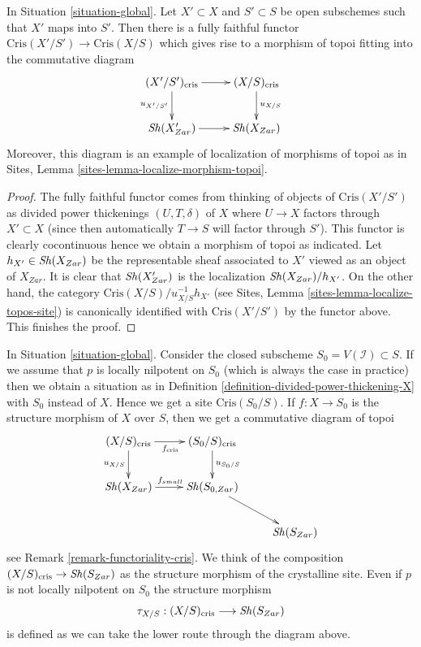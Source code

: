 \begin{lemma}
\label{lemma-localize}
In Situation \ref{situation-global}.
Let $X' \subset X$ and $S' \subset S$ be open subschemes such that
$X'$ maps into $S'$. Then there is a fully faithful functor
$\text{Cris}(X'/S') \to \text{Cris}(X/S)$
which gives rise to a morphism of topoi fitting into the commutative
diagram
$$
\xymatrix{
(X'/S')_{\text{cris}} \ar[r] \ar[d]_{u_{X'/S'}} &
(X/S)_{\text{cris}} \ar[d]^{u_{X/S}} \\
\Sh(X'_{Zar}) \ar[r] & \Sh(X_{Zar})
}
$$
Moreover, this diagram is an example of localization of morphisms of
topoi as in Sites, Lemma \ref{sites-lemma-localize-morphism-topoi}.
\end{lemma}

\begin{proof}
The fully faithful functor comes from thinking of
objects of $\text{Cris}(X'/S')$ as divided power
thickenings $(U, T, \delta)$ of $X$ where $U \to X$
factors through $X' \subset X$ (since then automatically $T \to S$
will factor through $S'$). This functor is clearly cocontinuous
hence we obtain a morphism of topoi as indicated.
Let $h_{X'} \in \mathop{\mathit{Sh}}\nolimits(X_{Zar})$ be the representable sheaf associated
to $X'$ viewed as an object of $X_{Zar}$. It is clear that
$\mathop{\mathit{Sh}}\nolimits(X'_{Zar})$ is the localization $\mathop{\mathit{Sh}}\nolimits(X_{Zar})/h_{X'}$.
On the other hand, the category $\text{Cris}(X/S)/u_{X/S}^{-1}h_{X'}$
(see Sites, Lemma \ref{sites-lemma-localize-topos-site})
is canonically identified with $\text{Cris}(X'/S')$ by the functor above.
This finishes the proof.
\end{proof}

\begin{remark}
\label{remark-structure-morphism}
In Situation \ref{situation-global}.
Consider the closed subscheme $S_0 = V(\mathcal{I}) \subset S$.
If we assume that $p$ is locally nilpotent on $S_0$ (which is always
the case in practice) then we obtain a situation as in
Definition \ref{definition-divided-power-thickening-X} with $S_0$ instead
of $X$. Hence we get a site $\text{Cris}(S_0/S)$. If $f : X \to S_0$
is the structure morphism of $X$ over $S$, then we get a
commutative diagram of topoi
$$
\xymatrix{
(X/S)_{\text{cris}}
\ar[r]_{f_{\text{cris}}} \ar[d]_{u_{X/S}} &
(S_0/S)_{\text{cris}} \ar[d]^{u_{S_0/S}} \\
\Sh(X_{Zar}) \ar[r]^{f_{small}} & \Sh(S_{0, Zar}) \ar[rd] \\
& & \Sh(S_{Zar})
}
$$
see Remark \ref{remark-functoriality-cris}. We think of the composition
$(X/S)_{\text{cris}} \to \mathop{\mathit{Sh}}\nolimits(S_{Zar})$ as the structure morphism of the
crystalline site. Even if $p$ is not locally nilpotent on $S_0$
the structure morphism
$$
\tau_{X/S} : (X/S)_{\text{cris}} \longrightarrow \mathop{\mathit{Sh}}\nolimits(S_{Zar})
$$
is defined as we can take the lower route through the diagram above.
\end{remark}


